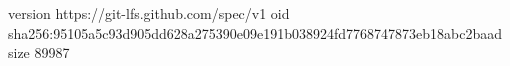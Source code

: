 version https://git-lfs.github.com/spec/v1
oid sha256:95105a5c93d905dd628a275390e09e191b038924fd7768747873eb18abc2baad
size 89987
